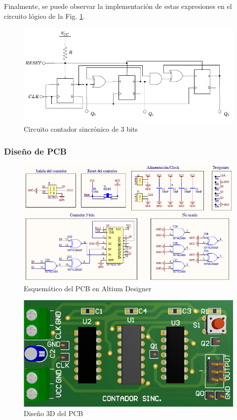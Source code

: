Finalmente, se puede observar la implementaci\'on de estas expresiones en el circuito l\'ogico de la Fig. \ref{fig:contador_sincronico_circuito}.

\begin{figure}[H]
    \centering
        \includegraphics[scale=0.65]{../EJ7/Recursos/contador_sincronico.png}
    \caption{Circuito contador sincr\'onico de 3 bits}
    \label{fig:contador_sincronico_circuito}
\end{figure}

\subsubsection{Dise\~no de PCB}

\begin{figure}[H]
    \centering
        \includegraphics[scale=0.7]{../EJ7/Recursos/esquematico_sincronico.PNG}
    \caption{Esquem\'atico del PCB en Altium Designer}
    \label{fig:esquematico_sincronico}
\end{figure}

\begin{figure}[H]
    \centering
    \includegraphics[scale=0.6]{../EJ7/Recursos/3d_top_sincronico.PNG}
    \caption{Dise\~no 3D del PCB}
    \label{fig:3d_sincronico_top}
\end{figure}

